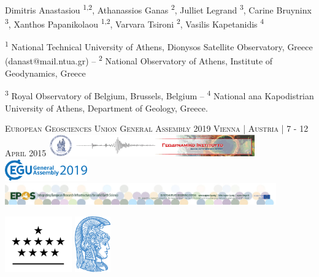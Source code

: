 \documentclass[landscape,a0paper,fontscale=0.328]{baposter} %
\begin{document}
\begin{poster}
{\large Dimitris Anastasiou \textsuperscript{1,2}, Athanassios Ganas \textsuperscript{2}, Julliet Legrand \textsuperscript{3}, Carine Bruyninx \textsuperscript{3}, Xanthos Papanikolaou \textsuperscript{1,2}, Varvara Tsironi \textsuperscript{2}, Vasilis Kapetanidis \textsuperscript{4} 
{\small \par{\textsuperscript{1} National Technical University of Athens, Dionysos Satellite Observatory, Greece (danast@mail.ntua.gr) -- \textsuperscript{2} National Observatory of Athens, Institute of Geodynamics, Greece} 
\par{\textsuperscript{3} Royal Observatory of Belgium, Brussels, Belgium --  \textsuperscript{4} National ana Kapodistrian University of Athens, Department of Geology, Greece. }} \vspace{0.3em}
\par{\textsc{European Geosciences Union General Assembly 2019 Vienna | Austria | 7 - 12 April 2015}} 
\vskip 0.2cm
{\includegraphics[height=2.5em]{../../logos/gein_logo.png} \includegraphics[height=2.5em]{../../logos/egu19_logo.png} \includegraphics[height=2.5em]{../../logos/epos_logo_big.jpg}} %

 }
{\includegraphics[height=6.5em]{../../logos/logo_orb.png} \includegraphics[height=6.5em]{../../logos/logo_uoa_blue.png}} %


\end{poster}
\end{document}
